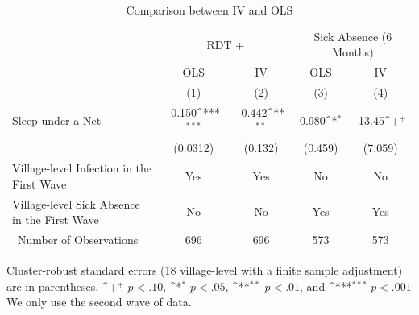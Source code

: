 \documentclass[fleqn,11pt]{article}
\newcommand{\sym}[1]{\rlap{$#1$}}
\def\sym#1{\ifmmode^{#1}\else\(^{#1}\)\fi
}
\begin{document}
\begin{table}[h]
\caption{Comparison between IV and OLS}
\label{ivandols}
\centering
\begin{adjustbox}{max width=\textwidth}
\begin{threeparttable}
\begin{tabular}{l*{4}{c}}
\hline\hline
                                        &\multicolumn{2}{c}{RDT +}&\multicolumn{2}{c}{Sick Absence (6 Months)}                   \\ \cmidrule(lr){2-3} \cmidrule(lr){4-5}
                                                            &\multicolumn{1}{c}{OLS}&\multicolumn{1}{c}{IV}&\multicolumn{1}{c}{OLS}&\multicolumn{1}{c}{IV}\\
                    &\multicolumn{1}{c}{(1)}&\multicolumn{1}{c}{(2)}&\multicolumn{1}{c}{(3)}&\multicolumn{1}{c}{(4)}\\

\hline
Sleep under a Net      &      -0.150\sym{***}&      -0.442\sym{**} &       0.980\sym{*}  &      -13.45\sym{+}  \\
                    &    (0.0312)         &     (0.132)         &     (0.459)         &     (7.059)         \\

Village-level Infection in the First Wave&       Yes&       Yes&  No                    &  No                    \\

Village-level Sick Absence in the First Wave&   No                   &   No                   &       Yes        &      Yes      \\

\hline \
Number of Observations        &         696         &         696         &         573         &         573         \\ \hline\hline
\end{tabular}
\begin{tablenotes}
\item Cluster-robust standard errors (18 village-level with a finite sample adjustment) are in parentheses. \sym{+} \(p<.10\), \sym{*} \(p<.05\), \sym{**} \(p<.01\), and \sym{***} \(p<.001\) We only use the second wave of data.
\end{tablenotes}
\end{threeparttable}
\end{adjustbox}

\end{table}
\end{document}
